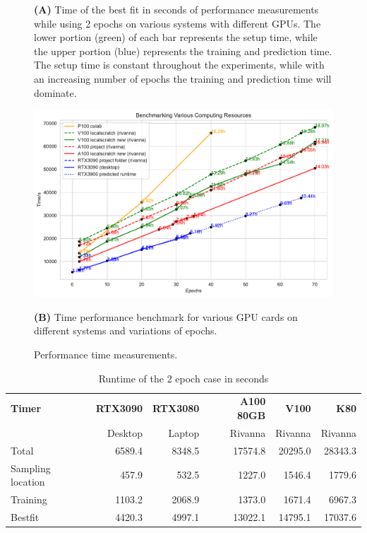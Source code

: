 \documentclass[utf8]{FrontiersinVancouver} %
\begin{document}
\begin{figure}[p]
{  {\bf (A)} Time of the best fit in seconds of performance measurements while using 2 epochs on various systems with different GPUs. The lower portion (green) of each bar represents the setup time, while the upper portion (blue) represents the training and prediction time. The setup time is constant throughout the experiments, while with an increasing number of epochs the training and prediction time will dominate. 
  
  
  \bigskip

  \centering\includegraphics[width=0.9\columnwidth]{images/Benchmark_comp_resource_new}

  {\bf (B)} Time performance benchmark for various GPU cards on different systems and variations of epochs.
  
  }
    
  \caption{Performance time measurements.}
  \label{fig:performance-projection}
\end{figure}

\begin{table}
    \caption{Runtime of the 2 epoch case in seconds}
    \label{tab:2-epoch-case}
    \begin{center}
    {\footnotesize              

          \begin{tabular}{|lrrrrr|}
            \hline
            {\bf Timer}             & {\bf RTX3090} & {\bf RTX3080} & {\bf A100 80GB} & {\bf V100}    & {\bf K80}     \\
                                    & Desktop & Laptop  & Rivanna & Rivanna & Rivanna \\
            \hline
            \hline
            Total             & 6589.4  & 8348.5  & 17574.8 & 20295.0 & 28343.3 \\
            Sampling location &  457.9  &  532.5  &  1227.0 &  1546.4 &  1779.6 \\
            Training          & 1103.2  & 2068.9  &  1373.0 &  1671.4 &  6967.3 \\
            Bestfit           & 4420.3  & 4997.1  & 13022.1 & 14795.1 & 17037.6 \\
            \hline
          \end{tabular}

    }
    \end{center}
\end{table}
\end{document}

